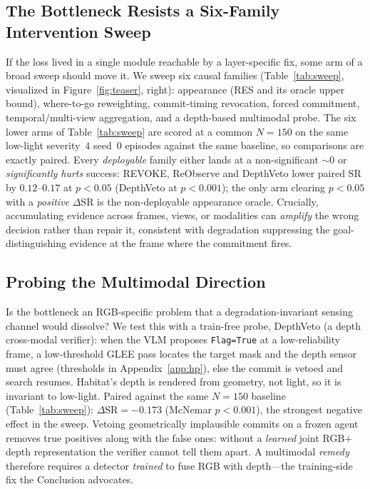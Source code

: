 \subsection{The Bottleneck Resists a Six-Family Intervention Sweep}
\label{sec:sweep}
If the loss lived in a single module reachable by a layer-specific fix,
some arm of a broad sweep should move it. We sweep six causal
families (Table~\ref{tab:sweep}, visualized in Figure~\ref{fig:teaser}, right):
appearance (RES and its oracle upper bound), where-to-go
reweighting, commit-timing revocation, forced commitment,
temporal/multi-view aggregation, and a depth-based multimodal probe. The
six lower arms of Table~\ref{tab:sweep} are scored at a common $N{=}150$
on the same low-light severity~$4$ seed~$0$ episodes against the same
baseline, so comparisons are exactly paired. Every
\emph{deployable} family either lands at a non-significant ${\sim}0$
or \emph{significantly hurts} success: REVOKE, ReObserve and DepthVeto
lower paired SR by $0.12$--$0.17$ at $p{<}0.05$ (DepthVeto at
$p{<}0.001$); the only arm clearing $p{<}0.05$ with a \emph{positive}
$\Delta$SR is the non-deployable appearance oracle.
Crucially, accumulating evidence across frames, views, or
modalities can \emph{amplify} the wrong decision rather than repair it,
consistent with degradation suppressing the goal-distinguishing
evidence at the frame where the commitment fires.

\subsection{Probing the Multimodal Direction}
\label{sec:road2}
Is the bottleneck an RGB-specific problem that a degradation-invariant
sensing channel would dissolve? We test this with a train-free probe,
DepthVeto (a depth cross-modal verifier): when the VLM proposes
\texttt{Flag=True} at a low-reliability frame, a low-threshold GLEE pass
locates the target mask and the depth sensor must agree (thresholds in
Appendix~\ref{app:hp}), else the commit is vetoed and search resumes.
Habitat's depth is rendered from geometry, not light, so it is invariant
to low-light. Paired against the same $N{=}150$ baseline
(Table~\ref{tab:sweep}): $\Delta\text{SR}{=}{-}0.173$ (McNemar
$p{<}0.001$), the strongest negative effect in the sweep. Vetoing geometrically
implausible commits on a frozen agent removes true positives along with
the false ones: without a \emph{learned} joint RGB$+$depth representation
the verifier cannot tell them apart. A multimodal \emph{remedy}
therefore requires a detector \emph{trained} to fuse RGB with
depth---the training-side fix the Conclusion advocates.

